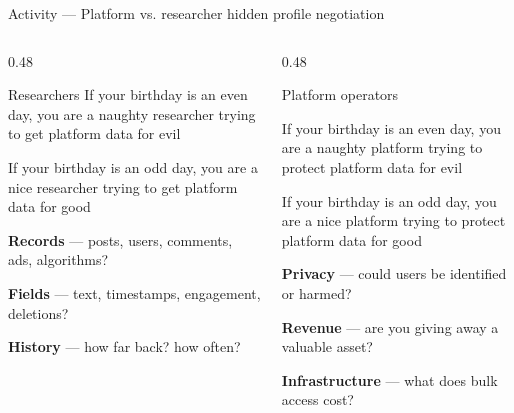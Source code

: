 \documentclass[9pt,aspectratio=169]{beamer}
\begin{document}
\begin{frame}{Activity --- Platform vs. researcher hidden profile negotiation}
    \begin{columns}[T]
        \begin{column}{0.48\textwidth}
            \begin{alertblock}{Researchers}
                \small
                If your birthday is an even day, you are a naughty researcher trying to get platform data for evil

                \medskip

                If your birthday is an odd day, you are a nice researcher trying to get platform data for good

                \medskip

                \textbf{Records} --- posts, users, comments, ads, algorithms?

                \medskip

                \textbf{Fields} --- text, timestamps, engagement, deletions?

                \medskip

                \textbf{History} --- how far back? how often?
            \end{alertblock}
        \end{column}

        \begin{column}{0.48\textwidth}
            \begin{alertblock}{Platform operators}
                \small
                
                If your birthday is an even day, you are a naughty platform trying to protect platform data for evil

                \medskip

                If your birthday is an odd day, you are a nice platform trying to protect platform data for good

                \medskip

                \textbf{Privacy} --- could users be identified or harmed?

                \medskip

                \textbf{Revenue} --- are you giving away a valuable asset?

                \medskip

                \textbf{Infrastructure} --- what does bulk access cost?

                \medskip


\end{alertblock}
\end{column}
\end{columns}
\end{frame}
\end{document}
